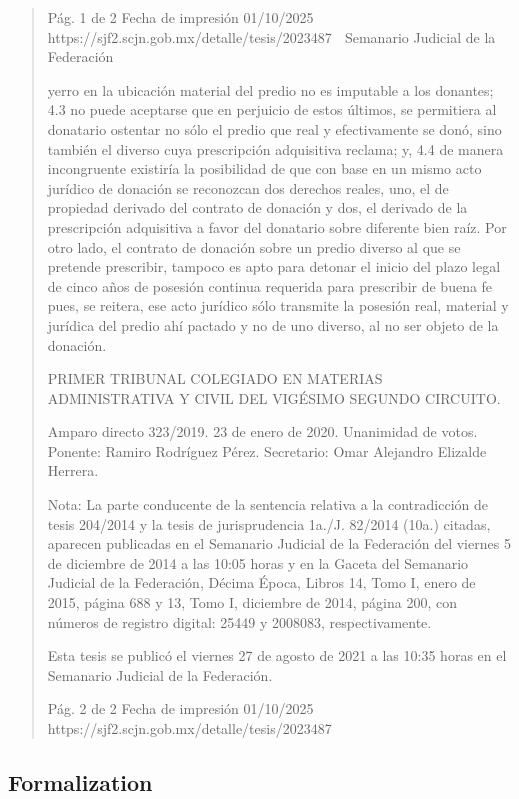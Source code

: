 \documentclass[11pt,a4paper]{article}
\begin{document}
\begin{quote}
                                              Pág. 1 de 2              Fecha de impresión 01/10/2025
  https://sjf2.scjn.gob.mx/detalle/tesis/2023487
                                                   Semanario Judicial de la Federación

yerro en la ubicación material del predio no es imputable a los donantes; 4.3 no puede aceptarse
que en perjuicio de estos últimos, se permitiera al donatario ostentar no sólo el predio que real y
efectivamente se donó, sino también el diverso cuya prescripción adquisitiva reclama; y, 4.4 de
manera incongruente existiría la posibilidad de que con base en un mismo acto jurídico de donación
se reconozcan dos derechos reales, uno, el de propiedad derivado del contrato de donación y dos,
el derivado de la prescripción adquisitiva a favor del donatario sobre diferente bien raíz. Por otro
lado, el contrato de donación sobre un predio diverso al que se pretende prescribir, tampoco es apto
para detonar el inicio del plazo legal de cinco años de posesión continua requerida para prescribir
de buena fe pues, se reitera, ese acto jurídico sólo transmite la posesión real, material y jurídica del
predio ahí pactado y no de uno diverso, al no ser objeto de la donación.

PRIMER TRIBUNAL COLEGIADO EN MATERIAS ADMINISTRATIVA Y CIVIL DEL VIGÉSIMO
SEGUNDO CIRCUITO.


Amparo directo 323/2019. 23 de enero de 2020. Unanimidad de votos. Ponente: Ramiro Rodríguez
Pérez. Secretario: Omar Alejandro Elizalde Herrera.

Nota: La parte conducente de la sentencia relativa a la contradicción de tesis 204/2014 y la tesis de
jurisprudencia 1a./J. 82/2014 (10a.) citadas, aparecen publicadas en el Semanario Judicial de la
Federación del viernes 5 de diciembre de 2014 a las 10:05 horas y en la Gaceta del Semanario
Judicial de la Federación, Décima Época, Libros 14, Tomo I, enero de 2015, página 688 y 13, Tomo
I, diciembre de 2014, página 200, con números de registro digital: 25449 y 2008083,
respectivamente.


Esta tesis se publicó el viernes 27 de agosto de 2021 a las 10:35 horas en el Semanario Judicial de
la Federación.




                                              Pág. 2 de 2             Fecha de impresión 01/10/2025
  https://sjf2.scjn.gob.mx/detalle/tesis/2023487

\end{quote}

\subsection{Formalization}
\end{document}
